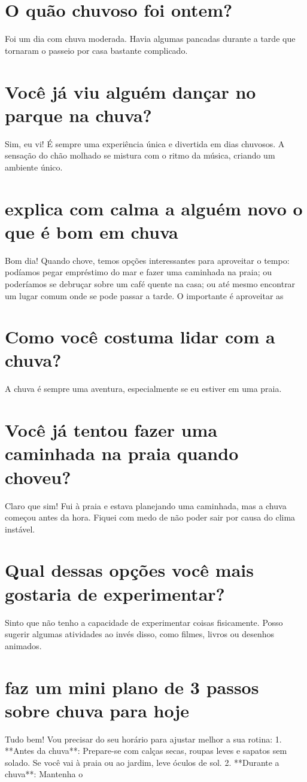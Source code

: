 \documentclass[11pt,a4paper]{article}
\begin{document}
\section{O quão chuvoso foi ontem?}
Foi um dia com chuva moderada. Havia algumas pancadas durante a tarde que tornaram o passeio por casa bastante complicado.

\section{Você já viu alguém dançar no parque na chuva?}
Sim, eu vi! É sempre uma experiência única e divertida em dias chuvosos. A sensação do chão molhado se mistura com o ritmo da música, criando um ambiente único.

\section{explica com calma a alguém novo o que é bom em chuva}
Bom dia! Quando chove, temos opções interessantes para aproveitar o tempo: podíamos pegar empréstimo do mar e fazer uma caminhada na praia; ou poderíamos se debruçar sobre um café quente na casa; ou até mesmo encontrar um lugar comum onde se pode passar a tarde. O importante é aproveitar as

\section{Como você costuma lidar com a chuva?}
A chuva é sempre uma aventura, especialmente se eu estiver em uma praia.

\section{Você já tentou fazer uma caminhada na praia quando choveu?}
Claro que sim! Fui à praia e estava planejando uma caminhada, mas a chuva começou antes da hora. Fiquei com medo de não poder sair por causa do clima instável.

\section{Qual dessas opções você mais gostaria de experimentar?}
Sinto que não tenho a capacidade de experimentar coisas fisicamente. Posso sugerir algumas atividades ao invés disso, como filmes, livros ou desenhos animados.

\section{faz um mini plano de 3 passos sobre chuva para hoje}
Tudo bem! Vou precisar do seu horário para ajustar melhor a sua rotina: 1. **Antes da chuva**: Prepare-se com calças secas, roupas leves e sapatos sem solado. Se você vai à praia ou ao jardim, leve óculos de sol. 2. **Durante a chuva**: Mantenha o
\end{document}
